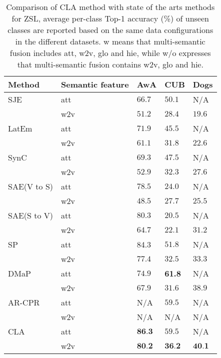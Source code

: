 \documentclass[review]{elsarticle}
\begin{document}
\begin{table}[!ht]
\small
\renewcommand{\arraystretch}{1.0}
\caption{Comparison of CLA method with state of the arts methods for ZSL, average per-class Top-1 accuracy (\%) of unseen classes are reported based on the same data configurations in the different datasets. w means that multi-semantic fusion includes att, w2v, glo and hie, while w/o expresses that multi-semantic fusion contains w2v, glo and hie.}
\label{table5}
\begin{center}
\newcommand{\tabincell}[2]{\begin{tabular}{@{}#1@{}}#2\end{tabular}}
\begin{tabular}{lp{2.3cm}p{1cm}p{1cm}p{1cm}}
\hline
\bfseries Method &\bfseries Semantic feature &\bfseries AwA &\bfseries CUB &\bfseries Dogs \\
\hline \hline
SJE\cite{7298911}  & att   &$66.7$ & $50.1$ &N/A \\
     & w2v &$51.2$ & $28.4$ &$19.6$ \\
\hline
LatEm\cite{7780384}  & att   &$71.9$ & $45.5$ &N/A  \\
     & w2v &$61.1$ & $31.8$ &$22.6$  \\
\hline
SynC\cite{Changpinyo2016} & att   &$69.3$ & $47.5$ &N/A \\
     & w2v &$52.9$ & $32.3$ &$27.6$ \\
\hline
SAE(V to S)\cite{Kodirov2017} & att   &$78.5$ &$24.0$ &N/A \\
     & w2v &$48.5$ & $27.7$ &$25.5$ \\
\hline
SAE(S to V)\cite{Kodirov2017} & att   &$80.3$ &$20.5$ &N/A \\
     & w2v &$64.7$ & $22.1$ &$31.2$ \\
\hline
SP\cite{Lin2018structure}   & att   &84.3 & $51.8$ &N/A \\
     & w2v &$77.4$ & $32.5$ &$33.3$ \\
\hline
DMaP\cite{Li2017Paths} & att   &$74.9$ & \textbf{61.8} &N/A \\
     & w2v &$67.9$ & $31.6$ &$38.9$ \\
\hline
AR-CPR\cite{8016672} & att   &N/A & $59.5$ &N/A \\
     & w2v &N/A & N/A &N/A \\
\hline\hline
CLA  & att   &$\textbf{86.3}$ & $59.5$ &N/A \\
     & w2v &$\textbf{80.2}$ & $\textbf{36.2}$ &$\textbf{40.1}$ \\
\hline
\end{tabular}
\end{center}
\end{table}
\end{document}

